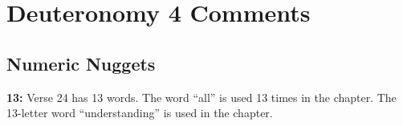 \section{Deuteronomy 4 Comments}

\subsection{Numeric Nuggets}
\textbf{13: } Verse 24 has 13 words. The word ``all'' is used 13 times in the chapter. The 13-letter word ``understanding'' is used in the chapter.